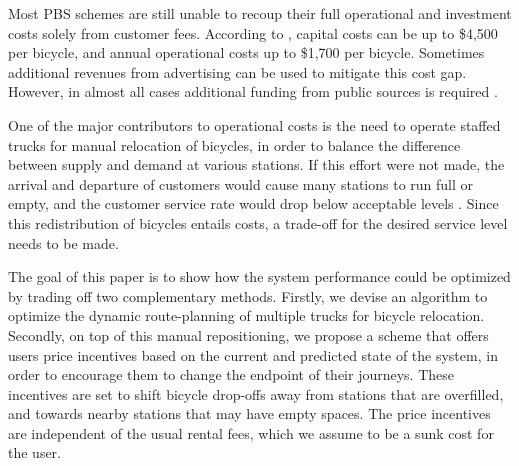 \documentclass{article}
\begin{document}
Most PBS schemes are still unable to recoup their full operational and
investment costs solely from customer fees. According to
\cite{midgley2011bicycle}, capital costs can be up to \$4,500 per bicycle, and
annual operational costs up to \$1,700 per bicycle. Sometimes additional
revenues from advertising can be used to mitigate this cost gap. However, in
almost all cases additional funding from public sources is required
\cite{shaheen_bikesharing_2010,wang2010bike}.

One of the major contributors to operational costs is the need to operate
staffed trucks for manual relocation of bicycles, in order to balance the
difference between supply and demand at various stations. If this effort were
not made, the arrival and departure of customers would cause many stations to
run full or empty, and the customer service rate would drop below acceptable
levels \cite{vogel_modeling_2010,obis_optimising_2011}. Since this
redistribution of bicycles entails costs, a trade-off for the desired service
level needs to be made.

The goal of this paper is to show how the system performance could be optimized
by trading off two complementary methods. Firstly, we devise an algorithm to
optimize the dynamic route-planning of multiple trucks for bicycle relocation.
Secondly, on top of this manual repositioning, we propose a scheme that offers
users price incentives based on the current and predicted state of the system, in
order to encourage them to change the endpoint of their journeys. These
incentives are set to shift bicycle drop-offs away from stations that are
overfilled, and towards nearby stations that may have empty spaces. The price
incentives are independent of the usual rental fees, which we assume to be a
sunk cost for the user.
\end{document}

